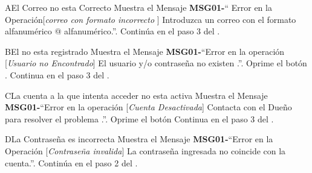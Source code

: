 	\begin{UCtrayectoriaA}{A}{El Correo no esta Correcto}
			\UCpaso Muestra el Mensaje {\bf MSG01-}`` Error en la Operación[{\em correo con formato incorrecto }] Introduzca un correo con el formato alfanumérico @ alfanumérico.''.
			\UCpaso Continúa en el paso 3 del .
		\end{UCtrayectoriaA}
		\begin{UCtrayectoriaA}{B}{El \UCactor no esta registrado}
			\UCpaso Muestra el Mensaje {\bf MSG01-}``Error en la operación [{\em Usuario no Encontrado}] El usuario y/o contraseña no existen .''.
			\UCpaso[\UCactor] Oprime el botón .
			\UCpaso[\UCactor] Continua en el paso 3 del .
		\end{UCtrayectoriaA}		
		\begin{UCtrayectoriaA}{C}{La cuenta a la que intenta acceder no esta activa}
			\UCpaso Muestra el Mensaje {\bf MSG01-}``Error en la operación [{\em Cuenta Desactivada}] Contacta con el Dueño para resolver el problema .''.
			\UCpaso[\UCactor] Oprime el botón 
			\UCpaso Continua en el paso 3 del .
		\end{UCtrayectoriaA}
		\begin{UCtrayectoriaA}{D}{La Contraseña es incorrecta}
			\UCpaso Muestra el Mensaje {\bf MSG01-}``Error en la Operación [{\em Contraseña invalida}] La contraseña ingresada no coincide con la cuenta.''.
			\UCpaso Continúa en el paso 2 del .
		\end{UCtrayectoriaA}
